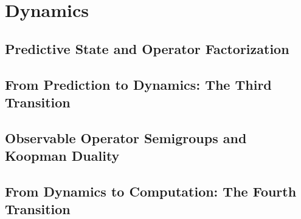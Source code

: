 \documentclass[12pt, oneside]{book}
\theoremstyle{definition}
\theoremstyle{remark}
\begin{document}


\part{Dynamics}


\chapter{Predictive State and Operator Factorization}
\label{chap:paper-one}




\chapter*{From Prediction to Dynamics: The Third Transition}
\label{interstitial:one-to-two}




\chapter{Observable Operator Semigroups and Koopman Duality}
\label{chap:paper-two}




\chapter*{From Dynamics to Computation: The Fourth Transition}
\label{interstitial:two-to-three}
\end{document}
